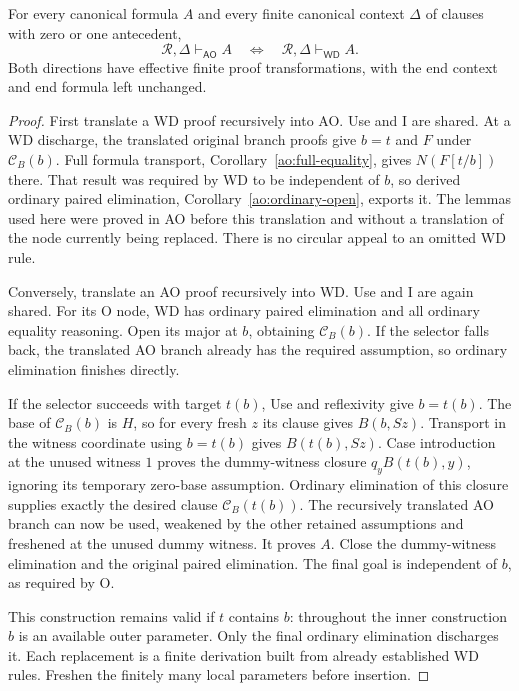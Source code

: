 \begin{theorem}
\label{ao:equivalence}
For every canonical formula $A$ and every finite canonical context
$\Delta$ of clauses with zero or one antecedent,
\[
 \mathcal R,\Delta\vdash_{\mathsf{AO}}A
 \quad\Longleftrightarrow\quad
 \mathcal R,\Delta\vdash_{\mathsf{WD}}A.
\]
Both directions have effective finite proof transformations, with the
end context and end formula left unchanged.
\end{theorem}
\begin{proof}
First translate a WD proof recursively into AO.  Use and I are shared.
At a WD discharge, the translated original branch proofs give $b=t$
and $F$ under $\mathcal C_B(b)$.  Full formula transport,
Corollary~\ref{ao:full-equality}, gives $N(F[t/b])$ there.  That result
was required by WD to be independent of $b$, so derived ordinary paired
elimination, Corollary~\ref{ao:ordinary-open}, exports it.  The lemmas
used here were proved in AO before this translation and without a
translation of the node currently being replaced.  There is no circular
appeal to an omitted WD rule.

Conversely, translate an AO proof recursively into WD.  Use and I are
again shared.  For its O node, WD has ordinary paired elimination and
all ordinary equality reasoning.  Open its major at $b$, obtaining
$\mathcal C_B(b)$.  If the selector falls back, the translated AO
branch already has the required assumption, so ordinary elimination
finishes directly.

If the selector succeeds with target $t(b)$, Use and reflexivity give
$b=t(b)$.  The base of $\mathcal C_B(b)$ is $H$, so for every fresh
$z$ its clause gives $B(b,Sz)$.  Transport in the witness coordinate
using $b=t(b)$ gives $B(t(b),Sz)$.  Case introduction at the unused
witness $1$ proves the dummy-witness closure
$q_y B(t(b),y)$, ignoring its temporary zero-base assumption.  Ordinary
elimination of this closure supplies exactly the desired clause
$\mathcal C_B(t(b))$.  The recursively translated AO branch can now
be used, weakened by the other retained assumptions and freshened at
the unused dummy witness.  It proves $A$.  Close the dummy-witness
elimination and the original paired elimination.  The final goal is
independent of $b$, as required by O.

This construction remains valid if $t$ contains $b$: throughout the
inner construction $b$ is an available outer parameter.  Only the final
ordinary elimination discharges it.  Each replacement is a finite
derivation built from already established WD rules.  Freshen the finitely
many local parameters before insertion.
\end{proof}


